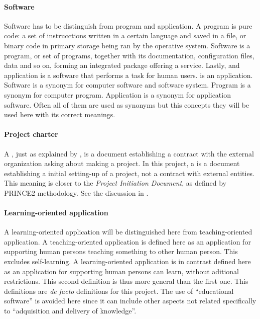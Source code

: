 \documentclass[twocolumn]{article}
\begin{document}
\paragraph{Software}
Software has to be distinguish from program and application. A program
is pure code: a set of instrucctions written in a certain language and
saved in a file, or binary code in primary storage being ran by the
operative system. Software is a program, or set of programs, together
with its documentation, configuration files, data and so on, forming
an integrated package offering a service. Lastly, and application is a
software that performs a task for human users. \fav is an
application. Software is a synonym for computer software and software
system. Program is a synonym for computer program. Application is a
synonym for application software. Often all of them are used as
synonyms but this concepts they will be used here with its correct
meanings.

\paragraph{Project charter}
A \chart, just as explained by \pmbok, is a document establishing a
contract with the external organization asking about making a
project. In this project, a \chart is a document establishing a
initial setting-up of a project, not a contract with external
entities. This meaning is closer to the \textit{Project Initiation
  Document}, as defined by PRINCE2 methodology. See the discussion in
.

\paragraph{Learning-oriented application}
A learning-oriented application will be distinguished here from
teaching-oriented application. A teaching-oriented application is
defined here as an application for supporting human persons teaching
something to other human person. This excludes self-learning. A
learning-oriented application is in contrast defined here as an
application for supporting human persons can learn, without aditional
restrictions. This second definition is thus more general than the
first one. This definitions are \textit{de facto} definitions for this
project. The use of ``educational software'' is avoided here since
it can include other aspects not related specifically to
``adquisition and delivery of knowledge''.
\end{document}
